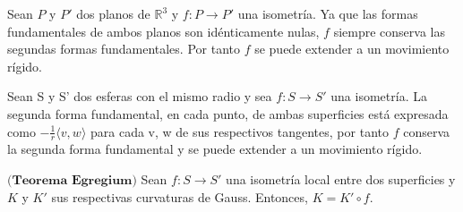 \begin{ejemplo}
		Sean $P$ y $P'$ dos planos de $\mathbb{R}^3$ y $f : P \to P'$ una isometría. Ya que las formas fundamentales de ambos planos son idénticamente nulas, $f$ siempre conserva las segundas formas fundamentales. Por tanto $f$ se puede extender a un movimiento rígido.
\end{ejemplo}

\begin{ejemplo}
	Sean S y S' dos esferas con el mismo radio y sea $f : S \to S'$ una isometría. La segunda forma fundamental, en cada punto, de ambas superficies está expresada como $-\frac{1}{r} \langle v,w \rangle$ para cada v, w de sus respectivos tangentes, por tanto $f$ conserva la segunda forma fundamental y se puede extender a un movimiento rígido.
\end{ejemplo}

\begin{teorema} \label{teo:egre}
	$\textbf{(Teorema Egregium)}$ Sean $f : S \to S'$ una isometría local entre dos superficies y $K$ y $K'$ sus respectivas curvaturas de Gauss. Entonces, $K = K'\circ f$.
\end{teorema}

